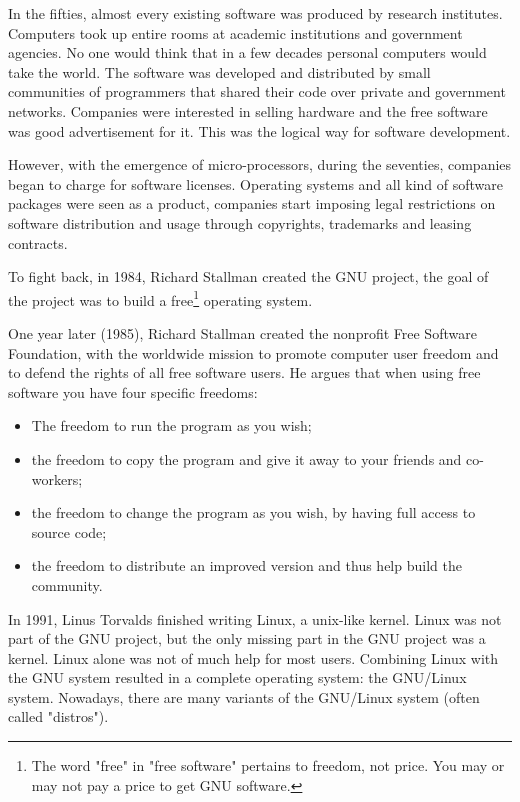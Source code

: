 In the fifties, almost every existing software was produced by research institutes. 
Computers took up entire rooms at academic institutions and government agencies.
No one would think that in a few decades personal computers would take the world.
The software was developed and distributed by small communities of
programmers that shared their code over private and government networks.
Companies were interested in selling hardware and the free software was good advertisement for it.
This was the logical way for software development.

However, with the emergence of micro-processors, during the seventies, companies began to charge for software licenses.
Operating systems and all kind of software packages were seen as a product, 
companies start imposing legal restrictions on software distribution and usage through copyrights, 
trademarks and leasing contracts.

To fight back, in 1984, Richard Stallman created the GNU project, the goal of the project was to build a 
\textsf{free}\footnote{
  The word "free" in "free software" pertains to freedom, not price. You may or may not pay a price to get GNU software.
}
operating system. 

One year later (1985), Richard Stallman created the nonprofit Free Software Foundation, with the worldwide mission to promote computer user freedom and to defend the rights of all free software users.
He argues that when using free software you have four specific freedoms:
\begin{itemize}
\item The freedom to run the program as you wish; 
\item the freedom to copy the program and give it away to your friends and co-workers; 
\item the freedom to change the program as you wish, by having full access to source code; 
\item the freedom to distribute an improved version and thus help build the community.
\end{itemize}
In 1991, Linus Torvalds finished writing Linux, a unix-like kernel.
Linux was not part of the GNU project, but the only missing part in the GNU project was a kernel.
Linux alone was not of much help for most users.
Combining Linux with the GNU system resulted in a complete operating system: the GNU/Linux system.
Nowadays, there are many variants of the GNU/Linux system (often called "distros").

